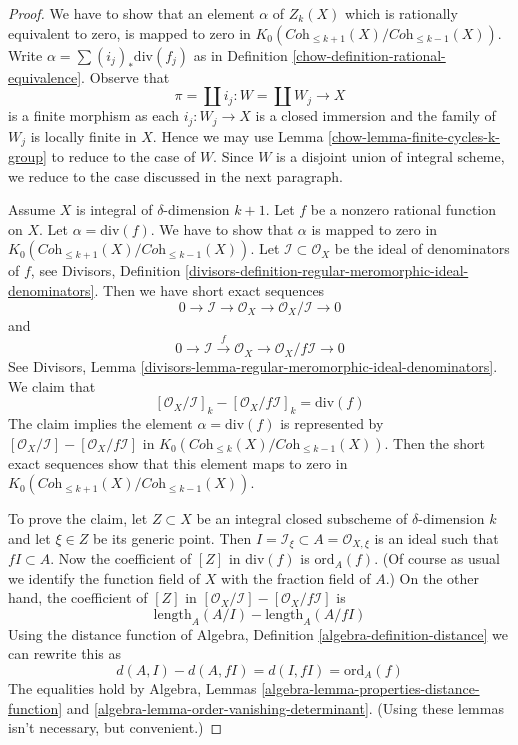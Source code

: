 \begin{proof}

We have to show that an element $\alpha$ of $Z_k(X)$ which is rationally
equivalent to zero, is mapped to zero in
$K_0(\textit{Coh}_{\leq k + 1}(X)/\textit{Coh}_{\leq k - 1}(X))$.
Write $\alpha = \sum (i_j)_*\text{div}(f_j)$ as in
Definition \ref{chow-definition-rational-equivalence}.
Observe that
$$
\pi = \coprod i_j : W = \coprod W_j \longrightarrow X
$$
is a finite morphism as each $i_j : W_j \to X$ is a closed immersion
and the family of $W_j$ is locally finite in $X$. Hence we may use
Lemma \ref{chow-lemma-finite-cycles-k-group} to reduce to the case of $W$.
Since $W$ is a disjoint union of integral scheme, we reduce
to the case discussed in the next paragraph.

\medskip\noindent
Assume $X$ is integral of $\delta$-dimension $k + 1$.
Let $f$ be a nonzero rational function on $X$.
Let $\alpha = \text{div}(f)$. We have to show that
$\alpha$ is mapped to zero in
$K_0(\textit{Coh}_{\leq k + 1}(X)/\textit{Coh}_{\leq k - 1}(X))$.
Let $\mathcal{I} \subset \mathcal{O}_X$ be the ideal of denominators
of $f$, see Divisors, Definition
\ref{divisors-definition-regular-meromorphic-ideal-denominators}.
Then we have short exact sequences
$$
0 \to \mathcal{I} \to \mathcal{O}_X \to \mathcal{O}_X/\mathcal{I} \to 0
$$
and
$$
0 \to \mathcal{I} \xrightarrow{f} \mathcal{O}_X \to
\mathcal{O}_X/f\mathcal{I} \to 0
$$
See Divisors, Lemma
\ref{divisors-lemma-regular-meromorphic-ideal-denominators}.
We claim that
$$
[\mathcal{O}_X/\mathcal{I}]_k - [\mathcal{O}_X/f\mathcal{I}]_k =
\text{div}(f)
$$
The claim implies the element $\alpha = \text{div}(f)$ is represented by
$[\mathcal{O}_X/\mathcal{I}] - [\mathcal{O}_X/f\mathcal{I}]$
in $K_0(\textit{Coh}_{\leq k}(X)/\textit{Coh}_{\leq k - 1}(X))$.
Then the short exact sequences show that this element maps to
zero in $K_0(\textit{Coh}_{\leq k + 1}(X)/\textit{Coh}_{\leq k - 1}(X))$.

\medskip\noindent
To prove the claim, let $Z \subset X$ be an integral closed subscheme
of $\delta$-dimension $k$ and let $\xi \in Z$ be its generic point.
Then $I = \mathcal{I}_\xi \subset A = \mathcal{O}_{X, \xi}$
is an ideal such that $fI \subset A$. Now the coefficient of
$[Z]$ in $\text{div}(f)$ is $\text{ord}_A(f)$. (Of course as usual
we identify the function field of $X$ with the fraction field of $A$.)
On the other hand, the coefficient of $[Z]$ in
$[\mathcal{O}_X/\mathcal{I}] - [\mathcal{O}_X/f\mathcal{I}]$
is
$$
\text{length}_A(A/I) - \text{length}_A(A/fI)
$$
Using the distance function of
Algebra, Definition \ref{algebra-definition-distance}
we can rewrite this as
$$
d(A, I) - d(A, fI) = d(I, fI) = \text{ord}_A(f)
$$
The equalities hold by Algebra, Lemmas
\ref{algebra-lemma-properties-distance-function} and
\ref{algebra-lemma-order-vanishing-determinant}.
(Using these lemmas isn't necessary, but convenient.)
\end{proof}

